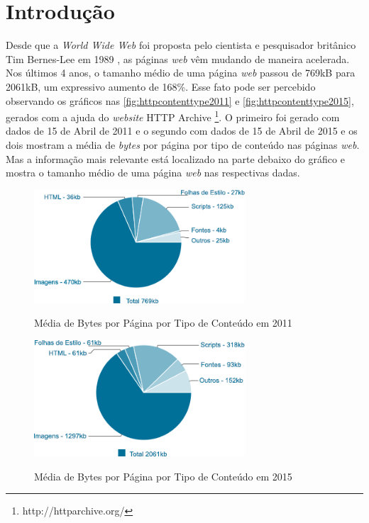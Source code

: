 %
%

\chapter{Introdução}\label{chap:introducao}

Desde que a \textit{World Wide Web} foi proposta pelo cientista e pesquisador britânico Tim Bernes-Lee em 1989 \cite{WebHistory}, as páginas \textit{web} vêm mudando de maneira acelerada. Nos últimos 4 anos, o tamanho médio de uma página \textit{web} passou de 769kB para 2061kB, um expressivo aumento de 168\%. Esse fato pode ser percebido observando os gráficos nas \autoref{fig:httpcontenttype2011} e \autoref{fig:httpcontenttype2015}, gerados com a ajuda do \textit{website} HTTP Archive \footnote{http://httparchive.org/}. O primeiro foi gerado com dados de 15 de Abril de 2011 e o segundo com dados de 15 de Abril de 2015 e os dois mostram a média de \textit{bytes} por página por tipo de conteúdo nas páginas \textit{web}. Mas a informação mais relevante está localizado na parte debaixo do gráfico e mostra o tamanho médio de uma página \textit{web} nas respectivas dadas.

\begin{figure}[!htb]
    \centering
    \caption{Média de Bytes por Página por Tipo de Conteúdo em 2011}
    \includegraphics[width=0.7\textwidth]{./04-figuras/introducao/bytes_content_type_april_2011}
    \label{fig:httpcontenttype2011}
\end{figure}

\begin{figure}[!htb]
    \centering
    \caption{Média de Bytes por Página por Tipo de Conteúdo em 2015}
    \includegraphics[width=0.7\textwidth]{./04-figuras/introducao/bytes_content_type_april_2015}
    \label{fig:httpcontenttype2015}
\end{figure}

